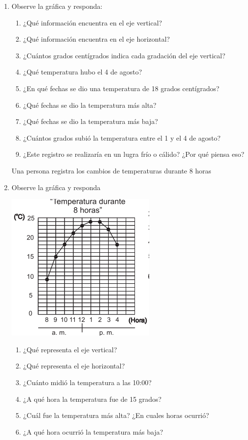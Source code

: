 \documentclass[10pt,twoside]{article}
\begin{document}
\begin{enumerate}
\item Observe la gráfica y responda:
\begin{enumerate}
\item ¿Qué información encuentra en el eje vertical?
\item ¿Qué información encuentra en el eje horizontal?
\item ¿Cuántos grados centígrados indica cada gradación del eje vertical?
\item ¿Qué temperatura hubo el 4 de agosto?
\item ¿En qué fechas se dio una temperatura de 18 grados centígrados?
\item ¿Qué fechas se dio la temperatura más alta?
\item ¿Qué fechas se dio la temperatura más baja?
\item ¿Cuántos grados subió la temperatura entre el 1 y el 4 de agosto?
\item ¿Este registro se realizaría en un lugra frío o cálido? ¿Por qué piensa eso?
\end{enumerate}
Una persona registra los cambios de temperaturas durante 8 horas
\item Observe la gr\'{a}fica y responda

\begin{minipage}{.4\textwidth}
\includegraphics[scale=.6]{Images/grafica2.png} 
\end{minipage}
\begin{minipage}{.55\textwidth}
\begin{enumerate}
\item ¿Qué representa el eje vertical?
\item ¿Qué representa el eje horizontal?
\item ¿Cuánto midió la temperatura a las 10:00?
\item ¿A qué hora la temperatura fue de 15 grados?
\item ¿Cuál fue la temperatura más alta? ¿En cuales horas ocurrió?
\item ¿A qué hora ocurrió la temperatura más baja?
\end{enumerate}
\end{minipage}
\end{enumerate}
\end{document}
